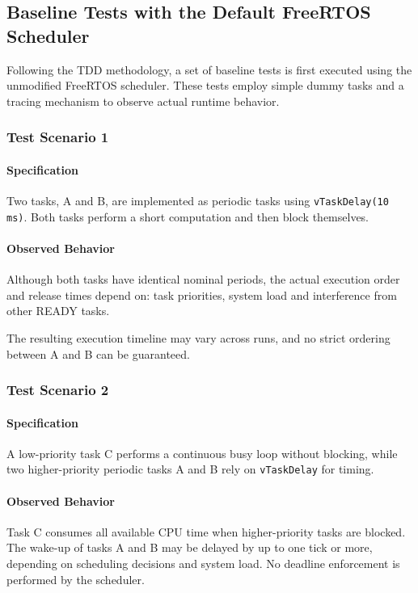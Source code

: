 \documentclass[12pt,english, makeidx, a4paper, titlepage,oneside]{article}
\begin{document}
\subsection{Baseline Tests with the Default FreeRTOS Scheduler}

Following the TDD methodology, a set of baseline tests is first executed using the unmodified FreeRTOS scheduler. These tests employ simple dummy tasks and a tracing mechanism to observe actual runtime behavior.

\subsubsection{Test Scenario 1}

\paragraph{Specification}
Two tasks, A and B, are implemented as periodic tasks using \texttt{vTaskDelay(10 ms)}. Both tasks perform a short computation and then block themselves.

\paragraph{Observed Behavior}
Although both tasks have identical nominal periods, the actual execution order and release times depend on: task priorities, system load and interference from other READY tasks.

\noindent The resulting execution timeline may vary across runs, and no strict ordering between A and B can be guaranteed.

\subsubsection{Test Scenario 2}

\paragraph{Specification}
A low-priority task C performs a continuous busy loop without blocking, while two higher-priority periodic tasks A and B rely on \texttt{vTaskDelay} for timing.

\paragraph{Observed Behavior}
Task C consumes all available CPU time when higher-priority tasks are blocked. The wake-up of tasks A and B may be delayed by up to one tick or more, depending on scheduling decisions and system load. No deadline enforcement is performed by the scheduler.
\end{document}
